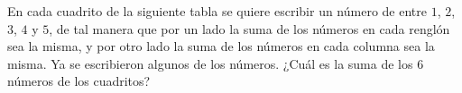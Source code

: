 En cada cuadrito de la siguiente tabla se quiere escribir un número de entre $1$, $2$, $3$, $4$ y $5$, de tal manera que por un lado la suma de los números en cada renglón sea la misma, y por otro lado la suma de los números en cada columna sea la misma. Ya se escribieron algunos de los números. ¿Cuál es la suma de los $6$ números de los cuadritos?